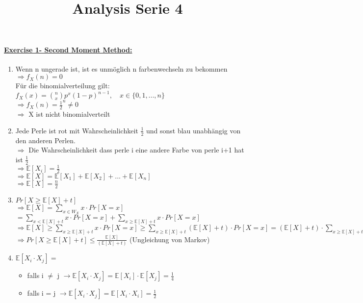 \documentclass[8pt]{extreport}
\title{Analysis Serie 4}
\begin{document}
\paragraph{\underline{Exercise 1- Second Moment Method:}}
\begin{enumerate}[label = (\alph*)]
\item Wenn n ungerade ist, ist es unmöglich n farbenwechseln zu bekommen
$\Rightarrow f_X(n) = 0$\\
Für die binomialverteilung gilt: $f_X(x) = \binom{n}{x}p^x(1-p)^{n-1}, \quad x \in \{0,1,...,n\}$\\
$\Rightarrow f_X(n) = \frac{1}{2}^n \neq 0$\\
$\Rightarrow$ X ist nicht binomialverteilt
\item Jede Perle ist rot mit Wahrscheinlichkeit $\frac{1}{2}$ und sonst blau unabhängig von den anderen Perlen.\\
$\Rightarrow$ Die Wahrscheinlichkeit dass perle i eine andere Farbe von perle i+1 hat ist $\frac{1}{2}$\\
$\Rightarrow \mathbb{E}[X_i] = \frac{1}{2}$\\
$\Rightarrow \mathbb{E} [X] = \mathbb{E}[X_1] + \mathbb{E}[X_2] + ... + \mathbb{E}[X_n]$\\
$\Rightarrow \mathbb{E} [X] = \frac{n}{2}$ 
\item $Pr[X \geq \mathbb{E}[X] + t]$\\
$\Rightarrow \mathbb{E}[X]  = \displaystyle\sum_{x \in W_X} x \cdot Pr[X=x]$\\
$ = \displaystyle\sum_{x < \mathbb{E}[X] + t} x \cdot Pr[X=x] + \displaystyle\sum_{ x \geq \mathbb{E}[X] + t} x \cdot Pr[X=x]$\\
$\Rightarrow \mathbb{E}[X] \geq  \displaystyle\sum_{ x \geq \mathbb{E}[X] + t} x \cdot Pr[X=x] \geq \displaystyle\sum_{ x \geq \mathbb{E}[X] + t} (\mathbb{E}[X]+t) \cdot Pr[X=x]  = (\mathbb{E}[X] + t) \cdot \displaystyle\sum_{ x \geq \mathbb{E}[X] + t} Pr[X=x]$\\
$\Rightarrow Pr[X \geq \mathbb{E}[X] + t] \leq \frac{\mathbb{E}[X]}{(\mathbb{E}[X] + t)}$ (Ungleichung von Markov)
\item $\mathbb{E}[X_i \cdot X_j]  =$\\
\begin{itemize}
\item falls i $\neq$ j $\rightarrow \mathbb{E}[X_i \cdot X_j] = \mathbb{E}[X_i] \cdot \mathbb{E}[X_j] = \frac{1}{4}$
\item falls i = j $\rightarrow \mathbb{E}[X_i \cdot X_j] = \mathbb{E}[X_i \cdot X_i] = \frac{1}{2}$

\end{itemize}
\end{enumerate}
\end{document}
